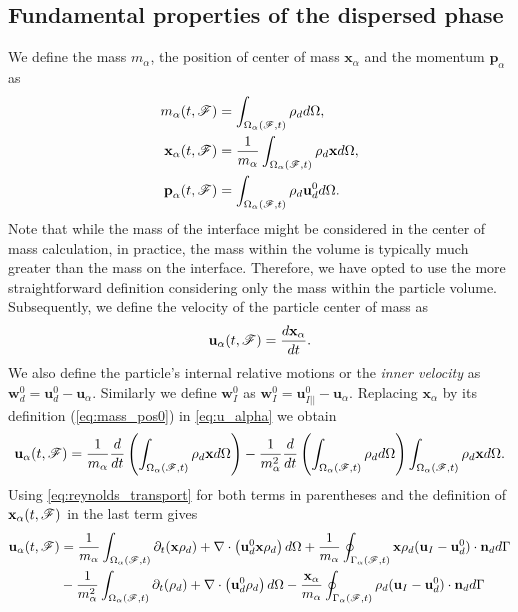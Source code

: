 \subsection{Fundamental properties of the dispersed phase}
We define the mass $m_\alpha$, the position of center of mass $\mathbf{x}_\alpha$ and the momentum $\textbf{p}_\alpha$ as
\begin{align}
    m_\alpha(t,\FF)
    &= \intOF{ \rho_d  }, 
    \\
    \textbf{x}_\alpha(t,\FF)
    &= \frac{1}{m_\alpha }\intOF{ \rho_d \textbf{x} }     \label{eq:mass_pos0},
    \\ \textbf{p}_\alpha(t,\FF)
    &= \intOF{ \rho_d \textbf{u}_d^0 }.
\end{align}
Note that while the mass of the interface might be considered in the center of mass calculation, in practice, the mass within the volume is typically much greater than the mass on the interface. 
Therefore, we have opted to use the more straightforward definition considering only the mass within the particle volume.
Subsequently, we define the velocity of the particle center of mass as
\begin{equation}
\textbf{u}_\alpha(t,\FF) = \frac{d \textbf{x}_\alpha}{dt}.
\label{eq:u_alpha}
\end{equation}
We also define the particle's internal relative motions or the \textit{inner velocity}  as $\textbf{w}_d^0 = \textbf{u}_d^0 - \textbf{u}_\alpha$. 
Similarly we define $\textbf{w}_I^0$ as $\textbf{w}_I^0 = \textbf{u}_{I||}^0 - \textbf{u}_\alpha$.
Replacing $\textbf{x}_\alpha$ by its definition (\ref{eq:mass_pos0}) in \ref{eq:u_alpha} we obtain
\begin{equation}
    \textbf{u}_\alpha(t,\mathscr{F}) = \frac{1}{m_\alpha}
    \frac{d}{dt} 
    \left(
        \int_{\Omega_{\alpha}(\mathscr{F},t)}  \rho_d \textbf{x}  d\Omega
    \right)
    - \frac{1}{m_\alpha^2} \frac{d}{dt} \left(\int_{\Omega_{\alpha}(\mathscr{F},t)}  \rho_d  d\Omega \right)
    \int_{\Omega_{\alpha}(\mathscr{F},t)}  \rho_d \textbf{x}  d\Omega.
\end{equation}
Using \ref{eq:reynolds_transport} for both terms in parentheses and the definition of $\textbf{x}_\alpha(t,\mathscr{F})$ in the last term gives
\begin{align}
    \textbf{u}_\alpha(t,\FF) &=  \frac{1}{m_\alpha}\intOF{
        \pddt (\textbf{x}\rho_d ) + \div\left(\textbf{u}_d^0 \textbf{x} \rho_d\right) 
    } 
    + \frac{1}{m_\alpha}\intSF{ \textbf{x} \rho_d(\textbf{u}_I - \textbf{u}_d^0) \cdot \textbf{n}_d } \nonumber\\
    & - \frac{1}{m_\alpha^2}\intOF{
        \pddt (\rho_d ) + \div\left(\textbf{u}_d^0 \rho_d\right) 
    } -  \frac{\textbf{x}_\alpha}{m_\alpha}    \intSF{ \rho_d(\textbf{u}_I   - \textbf{u}_d^0) \cdot \textbf{n}_d }
    \label{eq:u_alpha2}
\end{align}
